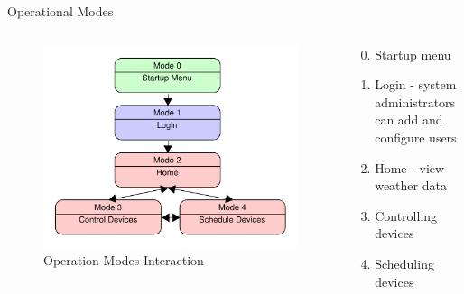 \documentclass{beamer}
\begin{document}
\begin{frame}{Operational Modes}{}
    \begin{columns}
      \begin{figure}
        \centering
        \includegraphics[scale=0.4]{figs/operationalModes.pdf}
        \caption{Operation Modes Interaction}
        \label{fig:functional_bd}
      \end{figure}
      \begin{block}{}
        \begin{enumerate}
            \setcounter{enumi}{-1}
            \item Startup menu
            \item Login - system administrators can add and configure users
            \item Home - view weather data
            \item Controlling devices
            \item Scheduling devices
        \end{enumerate}
    \end{block}
    \end{columns}
    
\end{frame}
\end{document}
